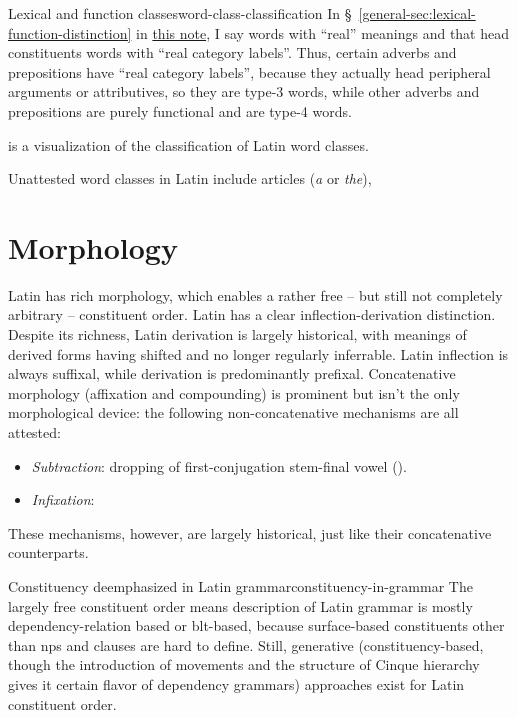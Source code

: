 \documentclass[UTF8, a4paper, oneside, scheme=plain]{ctexrep}
\newcommand*{\citesec}[1]{\S~{#1}}
\newcommand{\corpus}[1]{\emph{#1}}
\newcommand{\general}{\href{../methodology/glossing.pdf}{this note}}
\begin{document}
\begin{theorybox}{Lexical and function classes}{word-class-classification}
    In \citesec{\ref{general-sec:lexical-function-distinction}} in \general, 
    I say words with ``real'' meanings and that head constituents 
    words with ``real category labels''.
    Thus, certain adverbs and prepositions have ``real category labels'',
    because they actually head peripheral arguments or attributives,
    so they are type-3 words,
    while other adverbs and prepositions are purely functional and are type-4 words.
\end{theorybox}

 is a visualization of the classification of Latin word classes.

Unattested word classes in Latin include 
articles (\corpus{a} or \corpus{the}), %

\begin{sidewaysfigure}
    \centering
    
    \caption{Latin word classes}
    \label{fig:latin-word-class}
\end{sidewaysfigure}

\section{Morphology}

Latin has rich morphology,
which enables a rather free -- but still not completely arbitrary -- constituent order.
Latin has a clear inflection-derivation distinction.
Despite its richness, 
Latin derivation is largely historical,
with meanings of derived forms 
having shifted and no longer regularly inferrable.
Latin inflection is always suffixal,
while derivation is predominantly prefixal.
Concatenative morphology (affixation and compounding) 
is prominent but isn't the only morphological device:
the following non-concatenative mechanisms are all attested:
\begin{itemize}
    \item \emph{Subtraction}: dropping of first-conjugation stem-final vowel ().
    \item \emph{Infixation}:  %
\end{itemize}
These mechanisms, however, are largely historical,
just like their concatenative counterparts.

\begin{theorybox}{Constituency deemphasized in Latin grammar}{constituency-in-grammar}
    The largely free constituent order 
    means description of Latin grammar is mostly dependency-relation based or \acs{blt}-based,
    because surface-based constituents other than \acs{np}s and clauses are hard to define.
    Still, generative (constituency-based, 
    though the introduction of movements and the structure of Cinque hierarchy
    gives it certain flavor of dependency grammars) approaches exist for Latin constituent order.
\end{theorybox}
\end{document}
